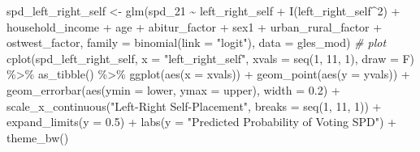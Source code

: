 \documentclass[
]{article}
\newenvironment{Shaded}{\begin{snugshade}}{\end{snugshade}}
\newcommand{\AttributeTok}[1]{\textcolor[rgb]{0.77,0.63,0.00}{#1}}
\newcommand{\CommentTok}[1]{\textcolor[rgb]{0.56,0.35,0.01}{\textit{#1}}}
\newcommand{\DecValTok}[1]{\textcolor[rgb]{0.00,0.00,0.81}{#1}}
\newcommand{\FloatTok}[1]{\textcolor[rgb]{0.00,0.00,0.81}{#1}}
\newcommand{\FunctionTok}[1]{\textcolor[rgb]{0.00,0.00,0.00}{#1}}
\newcommand{\NormalTok}[1]{#1}
\newcommand{\OtherTok}[1]{\textcolor[rgb]{0.56,0.35,0.01}{#1}}
\newcommand{\SpecialCharTok}[1]{\textcolor[rgb]{0.00,0.00,0.00}{#1}}
\newcommand{\StringTok}[1]{\textcolor[rgb]{0.31,0.60,0.02}{#1}}
\begin{document}
\begin{Shaded}
\begin{Highlighting}[]
\NormalTok{spd\_left\_right\_self }\OtherTok{\textless{}{-}} \FunctionTok{glm}\NormalTok{(spd\_21 }\SpecialCharTok{\textasciitilde{}}\NormalTok{ left\_right\_self }\SpecialCharTok{+} \FunctionTok{I}\NormalTok{(left\_right\_self}\SpecialCharTok{\^{}}\DecValTok{2}\NormalTok{) }\SpecialCharTok{+}\NormalTok{ household\_income }\SpecialCharTok{+}\NormalTok{ age }\SpecialCharTok{+}\NormalTok{ abitur\_factor }\SpecialCharTok{+}\NormalTok{ sex1 }\SpecialCharTok{+}\NormalTok{ urban\_rural\_factor }\SpecialCharTok{+}\NormalTok{ ostwest\_factor, }
                           \AttributeTok{family =} \FunctionTok{binomial}\NormalTok{(}\AttributeTok{link =} \StringTok{"logit"}\NormalTok{), }
                           \AttributeTok{data =}\NormalTok{ gles\_mod)}
\CommentTok{\# plot }
\FunctionTok{cplot}\NormalTok{(spd\_left\_right\_self, }\AttributeTok{x =} \StringTok{"left\_right\_self"}\NormalTok{, }
      \AttributeTok{xvals =} \FunctionTok{seq}\NormalTok{(}\DecValTok{1}\NormalTok{, }\DecValTok{11}\NormalTok{, }\DecValTok{1}\NormalTok{), }\AttributeTok{draw =}\NormalTok{ F) }\SpecialCharTok{\%\textgreater{}\%}
  \FunctionTok{as\_tibble}\NormalTok{() }\SpecialCharTok{\%\textgreater{}\%}
  \FunctionTok{ggplot}\NormalTok{(}\FunctionTok{aes}\NormalTok{(}\AttributeTok{x =}\NormalTok{ xvals)) }\SpecialCharTok{+}
  \FunctionTok{geom\_point}\NormalTok{(}\FunctionTok{aes}\NormalTok{(}\AttributeTok{y =}\NormalTok{ yvals)) }\SpecialCharTok{+}
  \FunctionTok{geom\_errorbar}\NormalTok{(}\FunctionTok{aes}\NormalTok{(}\AttributeTok{ymin =}\NormalTok{ lower, }\AttributeTok{ymax =}\NormalTok{ upper), }\AttributeTok{width =} \FloatTok{0.2}\NormalTok{) }\SpecialCharTok{+}
  \FunctionTok{scale\_x\_continuous}\NormalTok{(}\StringTok{"Left{-}Right Self{-}Placement"}\NormalTok{, }
                     \AttributeTok{breaks =} \FunctionTok{seq}\NormalTok{(}\DecValTok{1}\NormalTok{, }\DecValTok{11}\NormalTok{, }\DecValTok{1}\NormalTok{)) }\SpecialCharTok{+}
  \FunctionTok{expand\_limits}\NormalTok{(}\AttributeTok{y =} \FloatTok{0.5}\NormalTok{) }\SpecialCharTok{+}
  \FunctionTok{labs}\NormalTok{(}\AttributeTok{y =} \StringTok{"Predicted Probability of Voting SPD"}\NormalTok{) }\SpecialCharTok{+}
  \FunctionTok{theme\_bw}\NormalTok{()}
\end{Highlighting}
\end{Shaded}
\end{document}
